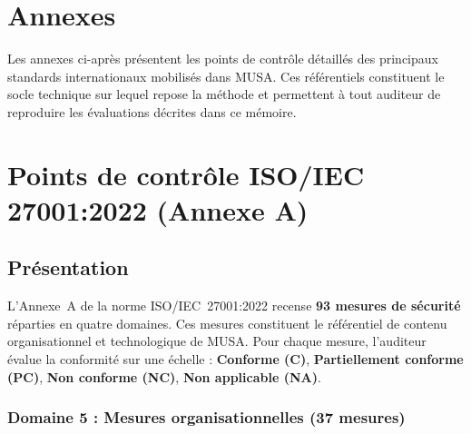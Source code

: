\documentclass[12pt,a4paper,oneside]{report}
\begin{document}
\vspace{0.5cm}
\cleardoublepage
\appendix
\renewcommand{\thechapter}{\Alph{chapter}}

\chapter*{Annexes}

Les annexes ci-après présentent les points de contrôle détaillés des principaux
standards internationaux mobilisés dans MUSA. Ces référentiels constituent le
socle technique sur lequel repose la méthode et permettent à tout auditeur de
reproduire les évaluations décrites dans ce mémoire.

\newpage

\chapter{Points de contrôle ISO/IEC 27001:2022 (Annexe A)}
\label{annexe:iso27001}

\section*{Présentation}

L'Annexe~A de la norme ISO/IEC~27001:2022 recense \textbf{93 mesures de sécurité}
réparties en quatre domaines. Ces mesures constituent le référentiel de contenu
organisationnel et technologique de MUSA. Pour chaque mesure, l'auditeur évalue
la conformité sur une échelle : \textbf{Conforme (C)}, \textbf{Partiellement conforme
(PC)}, \textbf{Non conforme (NC)}, \textbf{Non applicable (NA)}.

\vspace{0.4cm}

\subsection*{Domaine 5 : Mesures organisationnelles (37 mesures)}
\end{document}

